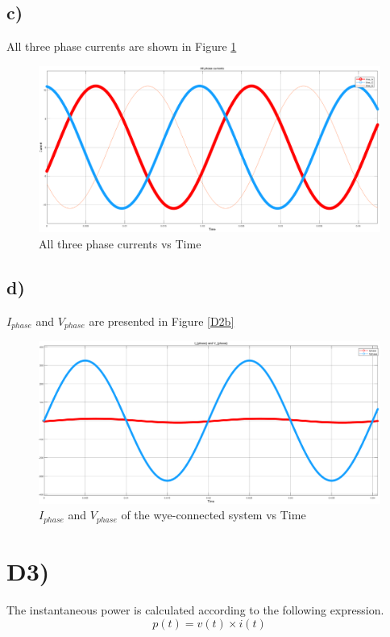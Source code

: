 \documentclass[letterpaper,12pt]{article}
\begin{document}
\subsection{c)}
All three phase currents are shown in Figure \ref*{D2c} 
\begin{figure}[H]
    \centering
    \includegraphics[width = 1\textwidth]{2c.png}
    \caption{All three phase currents vs Time}
    \label{D2c}
\end{figure} 
\subsection{d)}
\(I_{phase}\) and \(V_{phase}\) are presented in Figure \ref*{D2b} 
\begin{figure}[H]
    \centering
    \includegraphics[width = 1\textwidth]{2d.png}
    \caption{\(I_{phase}\) and \(V_{phase}\) of the wye-connected system vs Time}
    \label{D2d}
\end{figure} 
\section{D3)}
The instantaneous power is calculated according to the following expression.
\[
p(t) = v(t) \times i(t)    
\]
\end{document}
